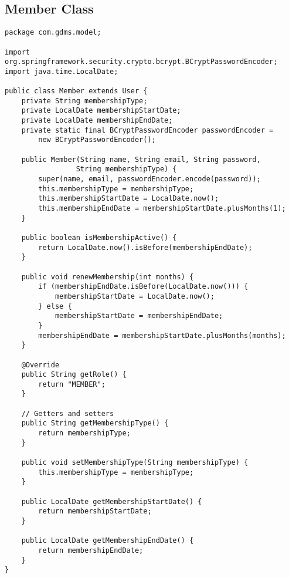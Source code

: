 \documentclass[12pt,a4paper]{report}
\begin{document}
\subsection{Member Class}
\begin{lstlisting}[caption=Member.java]
package com.gdms.model;

import org.springframework.security.crypto.bcrypt.BCryptPasswordEncoder;
import java.time.LocalDate;

public class Member extends User {
    private String membershipType;
    private LocalDate membershipStartDate;
    private LocalDate membershipEndDate;
    private static final BCryptPasswordEncoder passwordEncoder = 
        new BCryptPasswordEncoder();

    public Member(String name, String email, String password, 
                 String membershipType) {
        super(name, email, passwordEncoder.encode(password));
        this.membershipType = membershipType;
        this.membershipStartDate = LocalDate.now();
        this.membershipEndDate = membershipStartDate.plusMonths(1);
    }

    public boolean isMembershipActive() {
        return LocalDate.now().isBefore(membershipEndDate);
    }

    public void renewMembership(int months) {
        if (membershipEndDate.isBefore(LocalDate.now())) {
            membershipStartDate = LocalDate.now();
        } else {
            membershipStartDate = membershipEndDate;
        }
        membershipEndDate = membershipStartDate.plusMonths(months);
    }

    @Override
    public String getRole() {
        return "MEMBER";
    }

    // Getters and setters
    public String getMembershipType() {
        return membershipType;
    }

    public void setMembershipType(String membershipType) {
        this.membershipType = membershipType;
    }

    public LocalDate getMembershipStartDate() {
        return membershipStartDate;
    }

    public LocalDate getMembershipEndDate() {
        return membershipEndDate;
    }
}
\end{lstlisting}
\end{document}

